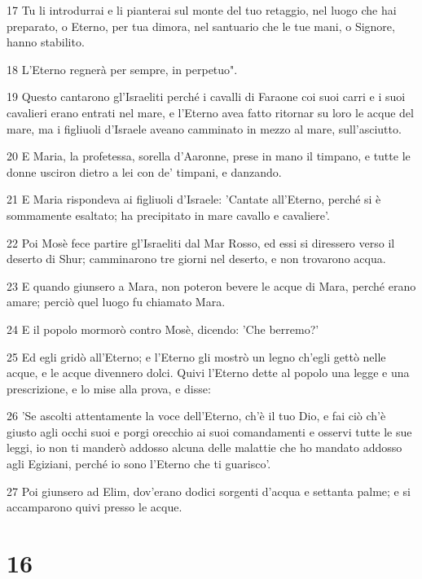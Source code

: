 \par 17 Tu li introdurrai e li pianterai sul monte del tuo retaggio, nel luogo che hai preparato, o Eterno, per tua dimora, nel santuario che le tue mani, o Signore, hanno stabilito.
\par 18 L'Eterno regnerà per sempre, in perpetuo".
\par 19 Questo cantarono gl'Israeliti perché i cavalli di Faraone coi suoi carri e i suoi cavalieri erano entrati nel mare, e l'Eterno avea fatto ritornar su loro le acque del mare, ma i figliuoli d'Israele aveano camminato in mezzo al mare, sull'asciutto.
\par 20 E Maria, la profetessa, sorella d'Aaronne, prese in mano il timpano, e tutte le donne usciron dietro a lei con de' timpani, e danzando.
\par 21 E Maria rispondeva ai figliuoli d'Israele: 'Cantate all'Eterno, perché si è sommamente esaltato; ha precipitato in mare cavallo e cavaliere'.
\par 22 Poi Mosè fece partire gl'Israeliti dal Mar Rosso, ed essi si diressero verso il deserto di Shur; camminarono tre giorni nel deserto, e non trovarono acqua.
\par 23 E quando giunsero a Mara, non poteron bevere le acque di Mara, perché erano amare; perciò quel luogo fu chiamato Mara.
\par 24 E il popolo mormorò contro Mosè, dicendo: 'Che berremo?'
\par 25 Ed egli gridò all'Eterno; e l'Eterno gli mostrò un legno ch'egli gettò nelle acque, e le acque divennero dolci. Quivi l'Eterno dette al popolo una legge e una prescrizione, e lo mise alla prova, e disse:
\par 26 'Se ascolti attentamente la voce dell'Eterno, ch'è il tuo Dio, e fai ciò ch'è giusto agli occhi suoi e porgi orecchio ai suoi comandamenti e osservi tutte le sue leggi, io non ti manderò addosso alcuna delle malattie che ho mandato addosso agli Egiziani, perché io sono l'Eterno che ti guarisco'.
\par 27 Poi giunsero ad Elim, dov'erano dodici sorgenti d'acqua e settanta palme; e si accamparono quivi presso le acque.

\chapter{16}

